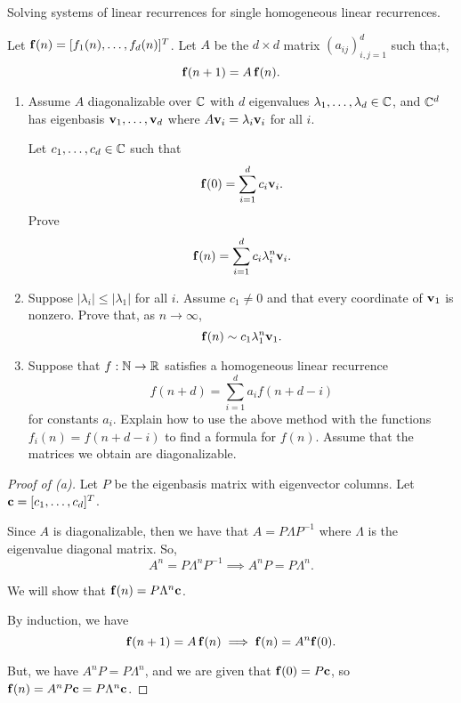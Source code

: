 \documentclass[../hw1]{subfiles}
\begin{document}
\begin{problem}
Solving systems of linear recurrences for single homogeneous linear recurrences.

Let $\bf{f}(n)=[f_1(n),\ldots,f_d(n)]^{T}$.
Let $A$ be the  $d\times d$ matrix $(a_{ij})_{i,j=1}^{d}$ such tha;t, \[
	\bf{f}(n+1)=A\,\bf{f}(n)
	.\]
\begin{enumerate}[label=(\alph*)]
	\item Assume $A$ diagonalizable over $\C$ with $d$ eigenvalues $\lambda_1,\ldots,\lambda_d\in \C$, and $\C^d$ has eigenbasis $\bf{v}_1,\ldots,\bf{v}_d$ where $A\bf{v}_i = \lambda_i \bf{v}_i$ for all $i$.

	      Let  $c_1,\ldots,c_d\in \C$ such that \[
		      \bf{f}(0)=\sum_{i=1}^{d} c_i\bf{v}_i
		      .\]
	      Prove \[
		      \bf{f}(n)=\sum_{i=1}^{d} c_i \lambda_i^n \bf{v}_i
		      .\]

	\item Suppose $|\lambda_i|\le |\lambda_1|$ for all $i$.
	      Assume $c_1\neq 0$ and that every coordinate of $\bf{v}_1$ is nonzero.
	      Prove that, as $n\to \infty$, \[
		      \bf{f}(n)\sim c_1\lambda_1^n \bf{v}_1
		      .\]

	\item Suppose that $f:\N\to \R$ satisfies a homogeneous linear recurrence \[
		      f(n+d)=\sum_{i=1}^{d} a_i f(n+d-i)
	      \] for constants $a_i$.
	      Explain how to use the above method with the functions $f_i(n)=f(n+d-i)$ to find a formula for $f(n)$.
	      Assume that the matrices we obtain are diagonalizable.
\end{enumerate}
\end{problem}
\begin{proof}[Proof of (a)]
	Let $P$ be the eigenbasis matrix with eigenvector columns.
	Let $\bf{c}=[c_1,\ldots,c_d]^{T}$.

	Since $A$ is diagonalizable, then we have that  $A=P \Lambda P^{-1}$ where $\Lambda$ is the eigenvalue diagonal matrix.
	So,\[
		A^n = P\Lambda^n P^{-1} \implies A^n P = P \Lambda^n
		.\]

	We will show that  $\bf{f}(n)=P \Lambda^n \bf{c}$.

	By induction,  we have \[
		\bf{f}(n+1)=A\,\bf{f}(n)  \implies \bf{f}(n)=A^n \bf{f}(0)
		.\]

	But, we have $A^n P = P \Lambda^n$, and we are given that $\bf{f}(0)=P \bf{c}$,
	so $\bf{f}(n)= A^n P \bf{c} = P\Lambda^n \bf{c}$.
\end{proof}
\end{document}
